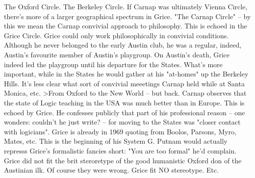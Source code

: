 \documentclass[10pt,titlepage]{book}
\begin{document}
The  Oxford Circle. The Berkeley Circle. If Carnap was ultimately Vienna 
Circle,  there’s more of a larger geographical spectrum in Grice. "The Carnap 
Circle" --  by this we mean the Carnap convivial approach to philosophy. 
This is echoed in  the Grice Circle. Grice could only work philosophically in 
convivial conditions.  Although he never belonged to the early Austin club, 
he was a regular, indeed,  Austin's favourite member of Austin's playgroup. 
On Austin's death, Grice indeed  led the playgroup until his departure for 
the States. What's more important,  while in the States he would gather at his 
"at-homes" up the Berkeley Hills.  It's less clear what sort of convivial 
meeetings Carnap held while at Santa  Monica, etc. 
>From  Oxford to the New World – but back. Carnap  observes that the state 
of Logic teaching in  the USA was much better than  in Europe. This is echoed 
by Grice. He confesses publicly that part of his  professional reason -- 
one wonders:  couldn't he just write? -- for moving  to the States was "closer 
contact 
with  logicians". Grice is already in  1969 quoting from Boolos, Parsons, 
Myro, Mates, etc.  This is the beginning  of his System G. Putnam would 
actually represss Grice's formalistic fancies  short: "You are too formal" he'd 
complain. Grice did not fit  the brit  steroretype of the good humanistic 
Oxford don of the 
Austinian ilk. Of   course they were wrong. Grice fit NO stereotype. Etc.
\end{document}
